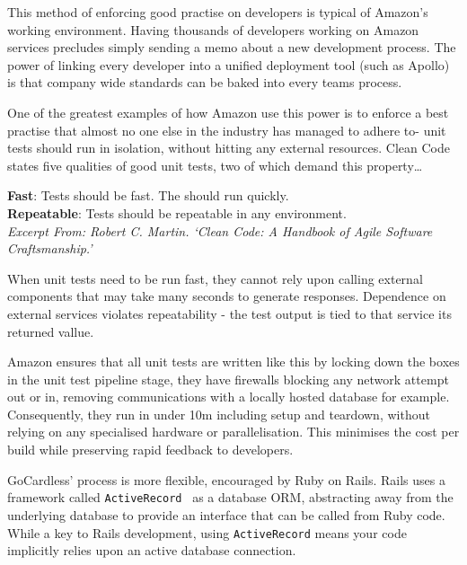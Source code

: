\documentclass[11pt]{article}
\begin{document}
This method of enforcing good practise on developers is typical of Amazon's
working environment. Having thousands of developers working on Amazon services
precludes simply sending a memo about a new development process. 
The power of linking every developer into a unified deployment tool 
(such as Apollo) is that company wide standards can be baked into every teams process.

One of the greatest examples of how Amazon use this power is to enforce a best
practise that almost no one else in the industry has managed to adhere to- unit
tests should run in isolation, without hitting any external resources. Clean
Code~\cite{cleanCode} states five qualities of good unit tests, two of which
demand this property\dots

\begin{displayquote}

  \textbf{Fast}: Tests should be fast. The should run quickly. \\
  \textbf{Repeatable}: Tests should be repeatable in any environment. \\

  \textit{Excerpt From: Robert C. Martin. `Clean Code: A Handbook of Agile
  Software Craftsmanship.'}

\end{displayquote}

When unit tests need to be run fast, they cannot rely upon calling external
components that may take many seconds to generate responses. Dependence on 
external services violates repeatability - the test output is
tied to that service its returned vallue. 

Amazon ensures that all unit tests are written like this by locking down
the boxes in the unit test pipeline stage, they have firewalls blocking any 
network attempt out or in, removing communications with a locally hosted database for
example. Consequently, they run in under 10m including setup and teardown, 
without relying on any specialised hardware or parallelisation. This minimises 
the cost per build while preserving rapid feedback to developers.

GoCardless' process is more flexible, encouraged by Ruby on
Rails. Rails uses a framework called
\texttt{ActiveRecord}~\cite{activeRecord} as a database ORM, abstracting away
from the underlying database to provide an interface that can be called from
Ruby code. While a key to Rails development, using \texttt{ActiveRecord} means
your code implicitly relies upon an active database connection.
\end{document}
